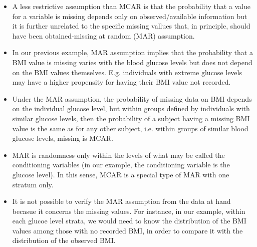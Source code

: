 \documentclass[11pt]{article}
\theoremstyle{break}
\begin{document}
\begin{definition}[MAR]
    \begin{itemize}
        \item A less restrictive assumption than MCAR is that the probability
            that a value for a variable is missing depends only on
            observed/available information but it is further unrelated to
            the specific missing vallues that, in principle, should have
            been obtained-missing at random (MAR) assumption.
        \item In our previous example, MAR assumption implies that the
            probability that a BMI value is missing varies with the
            blood glucose levels but does not depend on the BMI values
            themselves. E.g. individuals with extreme glucose levels may
            have a higher propensity for having their BMI value not recorded.


        \item Under the MAR assumption, the probability of missing data on BMI depends
    on the individual glucose level, but within groups defined by
    individuals with similar glucose levels, then the probability of a
    subject having a missing BMI value is the same as for any other subject,
    i.e. within groups of similar blood glucose levels, missing is MCAR.
\item MAR is randomness only within the levels of what may be called the
    conditioning variables (in our example, the conditioning variable
    is the glucose level). In this sense, MCAR is a special type of MAR
    with one stratum only.
\item It is not possible to verify the MAR assumption from the data at hand
    becasue it concerns the missing values. For instance, in our example, within
    each glucoe level strata, we would need to know the distribution of the
    BMI values among those with no recorded BMI, in order to compare it with the
    distribution of the observed BMI.
\end{itemize}
\end{definition}
\end{document}
